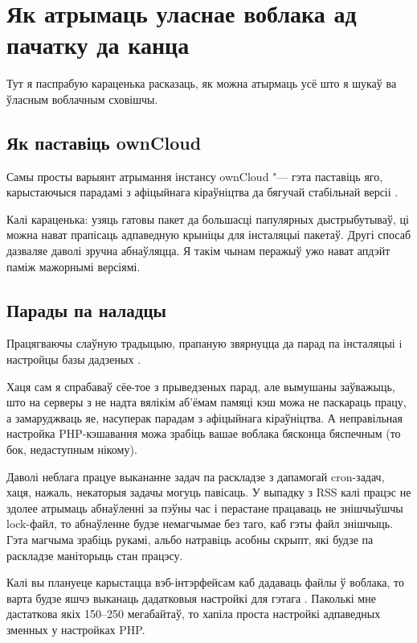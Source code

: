 \documentclass[10pt, a5paper]{article}
\begin{document}
\section*{Як атрымаць уласнае воблака ад пачатку да канца}

Тут я паспрабую караценька расказаць, як можна атырмаць усё што я шукаў ва ўласным воблачным сховішчы.

\subsection*{Як паставіць ownCloud}

Самы просты варыянт атрымання інстансу ownCloud "--- гэта паставіць яго, карыстаючыся парадамі з афіцыйнага кіраўніцтва да бягучай стабільнай версіі  \cite{zahar1}.

Калі караценька: узяць гатовы пакет да большасці папулярных дыстрыбутываў, ці можна нават прапісаць адпаведную крыніцы для інсталяцыі пакетаў. Другі спосаб дазваляе даволі зручна абнаўляцца. Я такім чынам перажыў ужо нават апдэйт паміж мажорнымі версіямі.

\subsection*{Парады па наладцы}

Працягваючы слаўную традыцыю, прапаную звярнуцца да парад па інсталяцыі \cite{zahar1} i настройцы базы дадзеных \cite{zahar4}.

Хаця сам я спрабаваў сёе-тое з прыведзеных парад, але вымушаны заўважыць, што на серверы з не надта вялікім аб'ёмам памяці кэш можа не паскараць працу, а замаруджваць яе, насуперак парадам з афіцыйнага кіраўніцтва. А неправільная настройка PHP-кэшавання можа зрабіць вашае воблака бясконца бяспечным (то бок, недаступным нікому).

Даволі неблага працуе выкананне задач па раскладзе з дапамогай cron-задач, хаця, нажаль, некаторыя задачы могуць павісаць. У выпадку з RSS калі працэс не здолее атрымаць абнаўленні за пэўны час і перастане працаваць не знішчыўшчы lock-файл, то абнаўленне будзе немагчымае без таго, каб гэты файл знішчыць. Гэта магчыма зрабіць рукамі, альбо натравіць асобны скрыпт, які будзе па раскладзе маніторыць стан працэсу.

Калі вы плануеце карыстацца вэб-інтэрфейсам каб дадаваць файлы ў воблака, то варта будзе яшчэ выканаць дадатковыя настройкі для гэтага \cite{zahar6}. Паколькі мне дастаткова якіх 150--250 мегабайтаў, то хапіла проста настройкі адпаведных зменных у настройках PHP.
\end{document}
